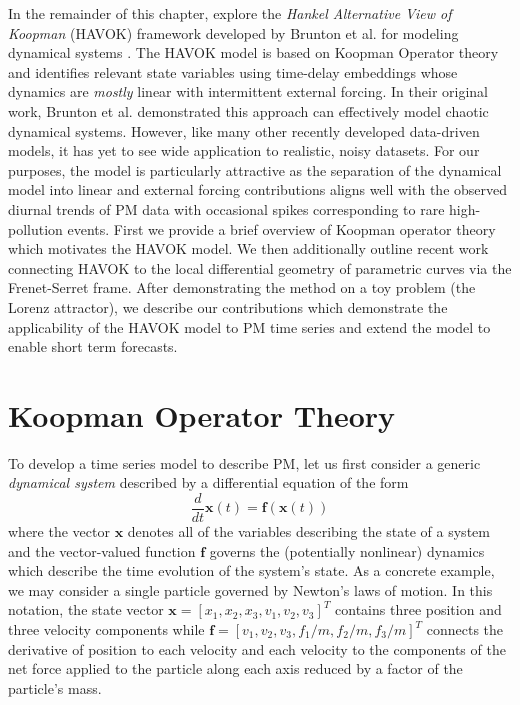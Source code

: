 In the remainder of this chapter, explore the \textit{Hankel Alternative View of
Koopman} (HAVOK) framework developed by Brunton et al. for modeling dynamical systems
\cite{brunton-havok-orig}. The HAVOK model is based on Koopman Operator theory
and identifies relevant state variables using time-delay embeddings whose
dynamics are \textit{mostly} linear with
intermittent external forcing. In their original work, Brunton et al.
demonstrated this approach can effectively model chaotic dynamical
systems. However, like many other recently developed data-driven models, it has yet to
see wide application to realistic, noisy datasets. For our purposes, the model
is particularly attractive as the separation of the dynamical model into linear
and external forcing contributions aligns well with the observed diurnal trends
of PM data with occasional spikes corresponding to rare high-pollution events.
First we provide a brief overview of Koopman operator theory which motivates
the HAVOK model. We then additionally outline recent work connecting HAVOK to
the local differential geometry of parametric curves via the Frenet-Serret
frame. After demonstrating the method on a toy problem (the Lorenz attractor),
we describe our contributions which demonstrate the applicability of the HAVOK
model to PM time series and extend the model to enable short term
forecasts.


\section{Koopman Operator Theory}

To develop a time series model to describe PM, let us first consider a generic
\textit{dynamical system} described by a differential equation of the form
\begin{equation}
  \frac{d}{dt} \mathbf{x}(t) = \mathbf{f}(\mathbf{x}(t))
\end{equation}
where the vector $\mathbf{x}$ denotes all of the variables describing the state of
a system and the vector-valued function $\mathbf{f}$ governs the (potentially nonlinear)
dynamics which describe the time evolution of the system's state. As a concrete
example, we may consider a single particle governed by Newton's laws of motion.
In this notation, the state vector $\mathbf{x}=[x_1, x_2, x_3, v_1, v_2, v_3]^T$ contains
three position and three velocity components while $\mathbf{f}=[v_1,v_2,v_3, f_1/m,
f_2/m, f_3/m]^T$ connects the derivative of position to each velocity and each
velocity to the components of the net force applied to the particle along each
axis reduced by a factor of the particle's mass.

